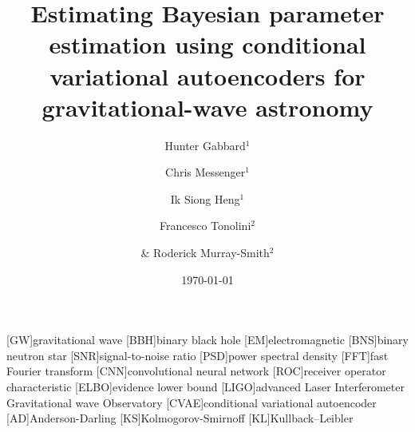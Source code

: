 \documentclass[%
showpacs,
 amsmath,amssymb,
 aps,
 twocolumn,
 prl,
 reprint,
floatfix,
]{revtex4-1}
\begin{document}

\title{Estimating Bayesian parameter estimation using conditional variational
autoencoders for gravitational-wave astronomy}

\author{Hunter Gabbard$^1$}
\author{Chris Messenger$^1$}
\author{Ik Siong Heng$^1$}
\author{Francesco Tonolini$^2$}
\author{\& Roderick Murray-Smith$^2$}


\date{\today}

\maketitle

[GW]{gravitational wave}
[BBH]{binary black hole}
[EM]{electromagnetic}
[BNS]{binary neutron star}
[SNR]{signal-to-noise ratio}
[PSD]{power spectral density}
[FFT]{fast Fourier transform}
[CNN]{convolutional neural network}
[ROC]{receiver operator characteristic}
[ELBO]{evidence lower bound}
[LIGO]{advanced Laser Interferometer Gravitational wave Observatory}
[CVAE]{conditional variational autoencoder}
[AD]{Anderson-Darling}
[KS]{Kolmogorov-Smirnoff}
[KL]{Kullback–Leibler}
\end{document}
